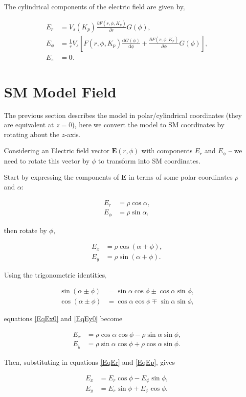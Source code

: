 \documentclass[]{article}
\begin{document}
	The cylindrical components of the electric field are given by,
	
	\begin{align}
		E_r &= V_s(K_p)\frac{\partial F(r,\phi,K_p)}{\partial r} G(\phi),\\
		E_\phi &= \frac{1}{r} V_s \left[ F(r,\phi,K_p)\frac{\text{d} G(\phi)}{\text{d} \phi} + \frac{\partial F(r,\phi,K_p)}{\partial \phi} G(\phi) \right],\\
		E_z &= 0.
	\end{align}

\section{SM Model Field}

	The previous section describes the model in polar/cylindrical coordinates (they are equivalent at $z=0$), here we convert the model to SM coordinates by rotating about the $z$-axis.
	
	Considering an Electric field vector $\mathbf{E}(r,\phi)$ with components $E_r$ and $E_\phi$ -- we need to rotate this vector by $\phi$ to transform into SM coordinates.
	
	Start by expressing the components of $\mathbf{E}$ in terms of some polar coordinates $\rho$ and $\alpha$:
	
	\begin{align}
		E_r &= \rho \cos{\alpha}, \label{EqEr}\\
		E_\phi &= \rho \sin{\alpha}, \label{EqEp}
	\end{align}
	
	then rotate by $\phi$,
	
	\begin{align}
		E_x &= \rho \cos{(\alpha + \phi)}, \label{EqEx0}\\
		E_y &= \rho \sin{(\alpha + \phi)}. \label{EqEy0}		
	\end{align}
	
	Using the trigonometric identities,
	
	\begin{align}
		\sin{(\alpha \pm \phi)} &= \sin\alpha\cos\phi \pm \cos\alpha\sin\phi, \\
		\cos{(\alpha \pm \phi)} &= \cos\alpha\cos\phi \mp \sin\alpha\sin\phi,
	\end{align}
	
	equations \ref{EqEx0} and \ref{EqEy0} become 
	
	\begin{align}
		E_x &= \rho\cos\alpha\cos\phi - \rho\sin\alpha\sin\phi, \\
		E_y &= \rho\sin\alpha\cos\phi + \rho\cos\alpha\sin\phi.
	\end{align}
	
	Then, substituting in equations \ref{EqEr} and \ref{EqEp}, gives
	
	\begin{align}
		E_x &= E_r\cos\phi - E_\phi\sin\phi, \\
		E_y &= E_r\sin\phi + E_\phi\cos\phi.
	\end{align}



\end{document}
